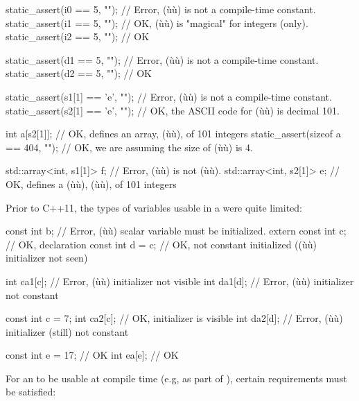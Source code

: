 \begin{emcppslisting}[emcppsbatch=e1]
static_assert(i0 == 5, "");         // Error, (ù{}ù) is not a compile-time constant.
static_assert(i1 == 5, "");         // OK, (ù{}ù) is "magical" for integers (only).
static_assert(i2 == 5, "");         // OK

static_assert(d1 == 5, "");         // Error, (ù{}ù) is not a compile-time constant.
static_assert(d2 == 5, "");         // OK

static_assert(s1[1] == 'e', "");    // Error, (ù{}ù) is not a compile-time constant.
static_assert(s2[1] == 'e', "");    // OK, the ASCII code for (ù{}ù) is decimal 101.

int a[s2[1]];                       // OK, defines an array, (ù{}ù), of 101 integers
static_assert(sizeof a == 404, ""); // OK, we are assuming the size of (ù{}ù) is 4.

std::array<int, s1[1]> f;           // Error, (ù{}ù) is not (ù{}ù).
std::array<int, s2[1]> e;           // OK, defines a (ù{}ù), (ù{}ù), of 101 integers
\end{emcppslisting}
    
\noindent Prior to C++11, the types of variables usable in a  were quite limited:

\begin{emcppslisting}
const int b;         // Error, (ù{}ù) scalar variable must be initialized.
extern const int c;  // OK, declaration
const int d = c;     // OK, not constant initialized ((ù{}ù) initializer not seen)

int ca1[c];          // Error, (ù{}ù) initializer not visible
int da1[d];          // Error, (ù{}ù) initializer not constant

const int c = 7;
int ca2[c];          // OK, initializer is visible
int da2[d];          // Error, (ù{}ù) initializer (still) not constant

const int e = 17;    // OK
int ea[e];           // OK
\end{emcppslisting}
    
\noindent For an  to be usable at compile time (e.g, as
part of ), certain requirements must be
satisfied:

